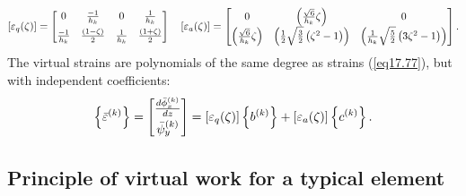 \documentclass{AeroStructure-ERJohnson}
\begin{document}
\begin{align}
\left[\varepsilon_{q}(\zeta)\right]=
\left[\begin{array}{@{}cccc@{}}
0 & \frac{-1}{h_{k}} & 0 & \frac{1}{h_{k}} \\[5pt]
\frac{-1}{h_{k}} & \frac{(1-\zeta)}{2} & \frac{1}{h_{k}} & \frac{(1+\zeta)}{2}
\end{array}\right] \quad\left[\varepsilon_{a}(\zeta)\right]=
\left[\begin{array}{@{}ccc@{}}
0 & \left(\frac{\sqrt{6}}{h_{k}} \zeta\right) & 0\\
\left(\frac{\sqrt{6}}{h_{k}} \zeta\right) & \left(\frac{1}{2} \sqrt{\frac{3}{2}}\left(\zeta^{2}-1\right)\right) & \left(\frac{1}{h_{k}} \sqrt{\frac{5}{2}}\left(3 \zeta^{2}-1\right)\right)\end{array}\right]. \label{eq17.78}
\end{align}
The virtual strains are polynomials of the same degree as strains (\ref{eq17.77}), but with independent coefficients:
\begin{align}\label{eq17.79}
\left\{\bar{\varepsilon}^{(k)}\right\}=\left[\begin{array}{@{}c@{}}\frac{d \bar{\phi}_{x}^{(k)}}{d z} \\[3pt]\bar{\psi}_{y}^{(k)}\end{array}\right]=\left[\varepsilon_{q}(\zeta)\right]\left\{b^{(k)}\right\}+\left[\varepsilon_{a}(\zeta)\right]\left\{c^{(k)}\right\}.
\end{align}

\vspace*{-0.6pc}

\subsection{Principle of virtual work for a typical element}\label{sec17.3.2}
\end{document}
